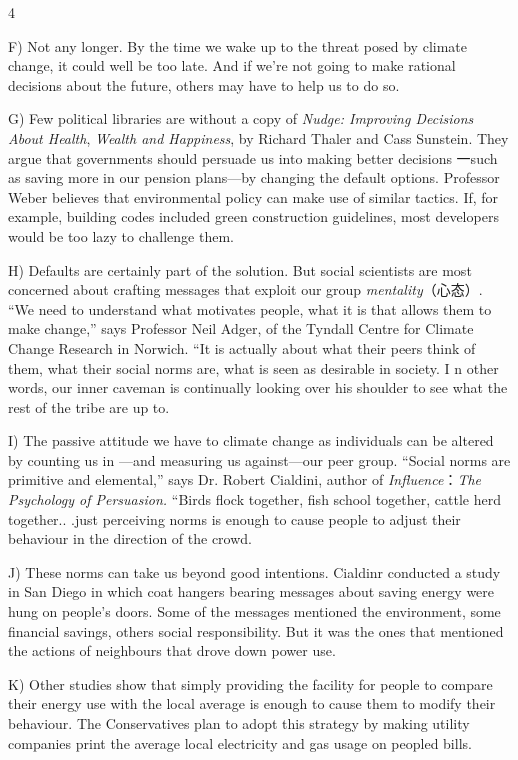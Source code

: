\documentclass[UTF8,11pt]{ctexart}
\begin{document}
4


F) Not any longer. By the time we wake up to the threat posed by climate change, it could well be too late. And if we’re not going to make rational decisions about the future, others may have to help us to do so.


G) Few political libraries are without a copy of\textit{ Nudge: Improving Decisions About Health},\textit{ Wealth and Happiness}, by Richard Thaler and Cass Sunstein. They argue that governments should persuade us into making better decisions 一such as saving more in our pension plans—by changing the default options. Professor Weber believes that environmental policy can make use of similar tactics. If, for example, building codes included green construction guidelines, most developers would be too lazy to challenge them.


H) Defaults are certainly part of the solution. But social scientists are most concerned about crafting messages that exploit our group\textit{ mentality}（心态）. “We need to understand what motivates people, what it is that allows them to make change,” says Professor Neil Adger, of the Tyndall Centre for Climate Change Research in Norwich. “It is actually about what their peers think of them, what their social norms are, what is seen as desirable in society. I n other words, our inner caveman is continually looking over his shoulder to see what the rest of the tribe are up to.


I) The passive attitude we have to climate change as individuals can be altered by counting us in —and measuring us against—our peer group. “Social norms are primitive and elemental,” says Dr. Robert Cialdini, author of\textit{ Influence}：\textit{The} \textit{Psychology of Persuasion.} “Birds flock together, fish school together, cattle herd together.. .just perceiving norms is enough to cause people to adjust their behaviour in the direction of the crowd.


J) These norms can take us beyond good intentions. Cialdinr conducted a study in San Diego in which coat hangers bearing messages about saving energy were hung on people’s doors. Some of the messages mentioned the environment, some financial savings, others social responsibility. But it was the ones that mentioned the actions of neighbours that drove down power use.


K) Other studies show that simply providing the facility for people to compare their energy use with the local average is enough to cause them to modify their behaviour. The Conservatives plan to adopt this strategy by making utility companies print the average local electricity and gas usage on peopled bills.
\end{document}

